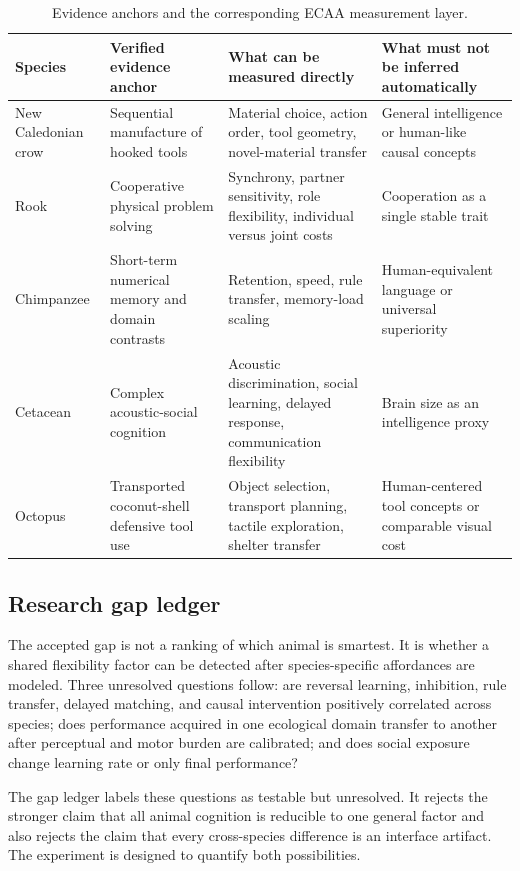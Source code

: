 \documentclass[conference]{IEEEtran}
\begin{document}
\begin{table}[t]
\centering
\caption{Evidence anchors and the corresponding ECAA measurement layer.}
\label{tab:evidence}
\small
\begin{tabular}{p{2.0cm}p{3.0cm}p{5.2cm}p{4.0cm}}
\toprule
Species & Verified evidence anchor & What can be measured directly & What must not be inferred automatically \\
\midrule
New Caledonian crow & Sequential manufacture of hooked tools~\cite{hunt2004} & Material choice, action order, tool geometry, novel-material transfer & General intelligence or human-like causal concepts \\
Rook & Cooperative physical problem solving~\cite{seed2008} & Synchrony, partner sensitivity, role flexibility, individual versus joint costs & Cooperation as a single stable trait \\
Chimpanzee & Short-term numerical memory and domain contrasts~\cite{matsuzawa2009} & Retention, speed, rule transfer, memory-load scaling & Human-equivalent language or universal superiority \\
Cetacean & Complex acoustic-social cognition~\cite{marino2007} & Acoustic discrimination, social learning, delayed response, communication flexibility & Brain size as an intelligence proxy \\
Octopus & Transported coconut-shell defensive tool use~\cite{finn2009} & Object selection, transport planning, tactile exploration, shelter transfer & Human-centered tool concepts or comparable visual cost \\
\bottomrule
\end{tabular}
\end{table}

\subsection{Research gap ledger}
The accepted gap is not a ranking of which animal is smartest. It is whether a shared flexibility factor can be detected after species-specific affordances are modeled. Three unresolved questions follow: are reversal learning, inhibition, rule transfer, delayed matching, and causal intervention positively correlated across species; does performance acquired in one ecological domain transfer to another after perceptual and motor burden are calibrated; and does social exposure change learning rate or only final performance?

The gap ledger labels these questions as testable but unresolved. It rejects the stronger claim that all animal cognition is reducible to one general factor and also rejects the claim that every cross-species difference is an interface artifact. The experiment is designed to quantify both possibilities.
\end{document}
